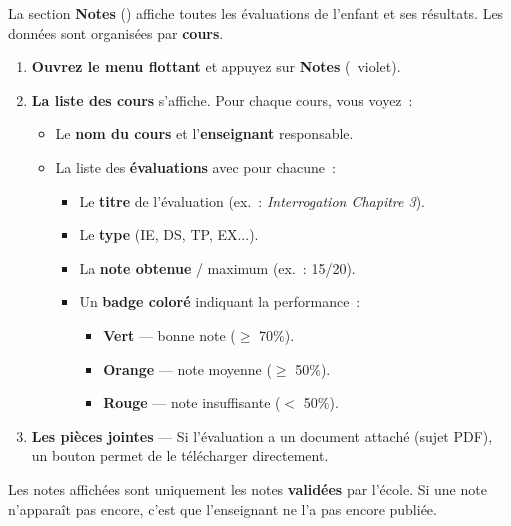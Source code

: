 La section \textbf{Notes} (\faChartBar) affiche toutes les \'evaluations de l'enfant et ses r\'esultats. Les donn\'ees sont organis\'ees par \textbf{cours}.

\begin{etape}[title=Proc\'edure : Consulter les notes]
\begin{enumerate}[leftmargin=1.5cm,label=\textbf{\arabic*.},itemsep=10pt]
  \item \textbf{Ouvrez le menu flottant} et appuyez sur \textbf{Notes} (\faChartBar\ violet).

  \item \textbf{La liste des cours} s'affiche. Pour chaque cours, vous voyez~:
  \begin{itemize}
    \item Le \textbf{nom du cours} et l'\textbf{enseignant} responsable.
    \item La liste des \textbf{\'evaluations} avec pour chacune~:
    \begin{itemize}
      \item Le \textbf{titre} de l'\'evaluation (ex.~: \textit{Interrogation Chapitre 3}).
      \item Le \textbf{type} (IE, DS, TP, EX...).
      \item La \textbf{note obtenue} / maximum (ex.~: 15/20).
      \item Un \textbf{badge color\'e} indiquant la performance~:
      \begin{itemize}
        \item \textcolor{emerald}{\textbf{Vert}} --- bonne note ($\geq$ 70\%).
        \item \textcolor{amber}{\textbf{Orange}} --- note moyenne ($\geq$ 50\%).
        \item \textcolor{rose}{\textbf{Rouge}} --- note insuffisante ($<$ 50\%).
      \end{itemize}
    \end{itemize}
  \end{itemize}

  \item \textbf{Les pi\`eces jointes} --- Si l'\'evaluation a un document attach\'e (sujet PDF), un bouton permet de le t\'el\'echarger directement.
\end{enumerate}
\end{etape}

\begin{info}
Les notes affich\'ees sont uniquement les notes \textbf{valid\'ees} par l'\'ecole. Si une note n'appara\^it pas encore, c'est que l'enseignant ne l'a pas encore publi\'ee.
\end{info}

